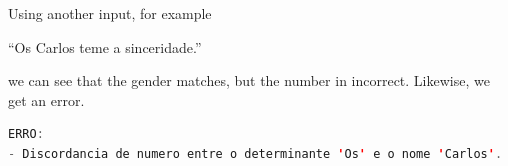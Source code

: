 

Using another input, for example

``Os Carlos teme a sinceridade.''

\noindent we can see that the gender matches, but the number in incorrect. Likewise, we get an error.

\begin{center}
\begin{minipage}{12cm}
\begin{lstlisting}[language=java, basicstyle=\small, label={lst:erro_number_dsl_excerpt}, caption=Example of a number error message]
ERRO:
- Discordancia de numero entre o determinante 'Os' e o nome 'Carlos'.
\end{lstlisting}
\end{minipage}
\end{center}


